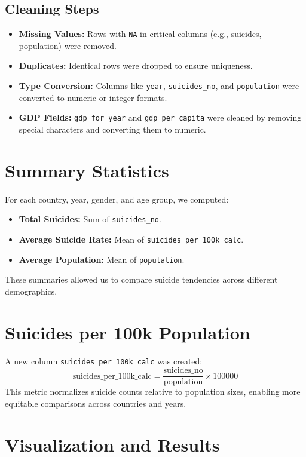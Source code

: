 \documentclass[12pt,a4paper]{article}
\begin{document}
\subsection{Cleaning Steps}
\begin{itemize}
  \item \textbf{Missing Values:} Rows with \texttt{NA} in critical columns (e.g., suicides, population) were removed.
  \item \textbf{Duplicates:} Identical rows were dropped to ensure uniqueness.
  \item \textbf{Type Conversion:} Columns like \texttt{year}, \texttt{suicides\_no}, and \texttt{population} were converted to numeric or integer formats.
  \item \textbf{GDP Fields:} \texttt{gdp\_for\_year} and \texttt{gdp\_per\_capita} were cleaned by removing special characters and converting them to numeric.
\end{itemize}

\section{Summary Statistics}
For each country, year, gender, and age group, we computed:
\begin{itemize}
  \item \textbf{Total Suicides:} Sum of \texttt{suicides\_no}.
  \item \textbf{Average Suicide Rate:} Mean of \texttt{suicides\_per\_100k\_calc}.
  \item \textbf{Average Population:} Mean of \texttt{population}.
\end{itemize}
These summaries allowed us to compare suicide tendencies across different demographics.

\section{Suicides per 100k Population}
A new column \texttt{suicides\_per\_100k\_calc} was created:
\[
\text{suicides\_per\_100k\_calc} = \frac{\text{suicides\_no}}{\text{population}} \times 100000
\]
This metric normalizes suicide counts relative to population sizes, enabling more equitable comparisons across countries and years.

\section{Visualization and Results}
\end{document}

